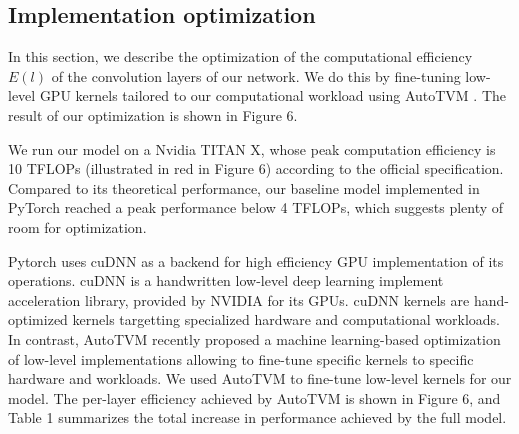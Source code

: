 \documentclass[runningheads]{llncs}
\begin{document}
\subsection{Implementation optimization}

In this section, we describe the optimization of the computational efficiency $E(l)$ of the convolution layers of our network.
We do this by fine-tuning low-level GPU kernels tailored to our computational workload using AutoTVM \cite{chen2018tvm}.
The result of our optimization is shown in Figure 6.

We run our model on a Nvidia TITAN X, whose peak computation efficiency is 10 TFLOPs (illustrated in red in Figure 6) according to the official specification.
Compared to its theoretical performance, our baseline model implemented in PyTorch reached a peak performance below 4 TFLOPs,
which suggests plenty of room for optimization.

Pytorch uses cuDNN as a backend for high efficiency GPU implementation of its operations.
cuDNN \cite{chetlur2014cudnn} is a handwritten low-level deep learning implement acceleration library, provided by NVIDIA for its GPUs. 
cuDNN kernels are hand-optimized kernels targetting specialized hardware and computational workloads. 
In contrast, AutoTVM \cite{chen2018tvm} recently proposed a machine learning-based optimization of low-level implementations 
allowing to fine-tune specific kernels to specific hardware and workloads.
We used AutoTVM to fine-tune low-level kernels for our model.
The per-layer efficiency achieved by AutoTVM is shown in Figure 6, and Table 1 summarizes the total increase in performance achieved by the full model.
\end{document}
